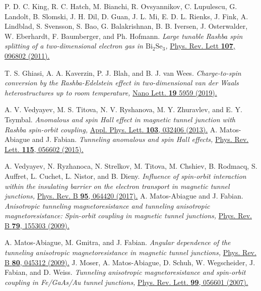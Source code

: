 \documentclass[10pt,pr,twocolumn,showpacs,amssymb,floatfix,superscriptaddress]{revtex4-1}
\begin{document}
\begin{thebibliography}{999}
 P. D. C. King, R. C. Hatch, M. Bianchi, R. Ovsyannikov, C. Lupulescu, G. Landolt, B. Slomski, J. H. Dil, D. Guan, J. L. Mi, E. D. L. Rienks, J. Fink, A. Lindblad, S. Svensson, S. Bao, G. Balakrishnan, B. B. Iversen, J. Osterwalder, W. Eberhardt, F. Baumberger, and Ph. Hofmann. 
\textit{Large tunable Rashba spin splitting of a two-dimensional electron gas in $\text{Bi}_2\text{Se}_3$,}
\href{https://doi.org/10.1103/PhysRevLett.107.096802}{Phys. Rev. Lett {\bf 107}, 096802 (2011).}

 T. S. Ghiasi, A. A. Kaverzin, P. J. Blah, and B. J. van Wees. 
\textit{Charge-to-spin conversion by the Rashba-Edelstein effect in two-dimensional van der Waals heterostructures up to room temperature,}
\href{https://doi.org/10.1021/acs.nanolett.9b01611}{Nano Lett. {\bf 19} 5959 (2019).}

 A. V. Vedyayev, M. S. Titova, N. V. Ryshanova, M. Y. Zhuravlev, and E. Y. Tsymbal. 
\textit{Anomalous and spin Hall effect in magnetic tunnel junction with Rashba spin-orbit coupling,}
\href{https://doi.org/10.1063/1.4815866}{Appl. Phys. Lett. {\bf 103}, 032406 (2013).}
A. Matos-Abiague and J. Fabian. 
\textit{Tunneling anomalous and spin Hall effects,}
\href{https://doi.org/10.1103/PhysRevLett.115.056602}{Phys. Rev. Lett. {\bf 115}, 056602 (2015).}

 A. Vedyayev, N. Ryzhanoca, N. Strelkov, M. Titova, M. Chshiev, B. Rodmacq, S. Auffret, L. Cuchet, L. Nistor, and B. Dieny. 
\textit{Influence of spin-orbit interaction within the insulating barrier on the electron transport in magnetic tunnel junctions,}
\href{https://doi.org/10.1103/PhysRevB.95.064420}{Phys. Rev. B {\bf 95}, 064420 (2017).}
 A. Matos-Abiague and J. Fabian. 
\textit{Anisotropic tunneling magnetoresistance and tunneling anisotropic magnetoresistance: Spin-orbit coupling in magnetic tunnel junctions,}
\href{https://doi.org/10.1103/PhysRevB.79.155303}{Phys. Rev. B {\bf 79}, 155303 (2009). }


 A. Matos-Abiague, M. Gmitra, and J. Fabian. 
\textit{Angular dependence of the tunneling anisotropic magnetoresistance in magnetic tunnel junctions,}
\href{https://doi.org/10.1103/PhysRevB.80.045312}{Phys. Rev. B {\bf 80}, 045312 (2009).}
J. Moser, A. Matos-Abiague, D. Schuh, W. Wegscheider, J. Fabian, and D. Weiss.
\textit{Tunneling anisotropic magnetoresistance and spin-orbit coupling in Fe/GaAs/Au tunnel junctions,}
\href{https://doi.org/10.1103/PhysRevLett.99.056601}{ Phys. Rev. Lett. {\bf 99}, 056601 (2007).}


\end{thebibliography}
\end{document}
